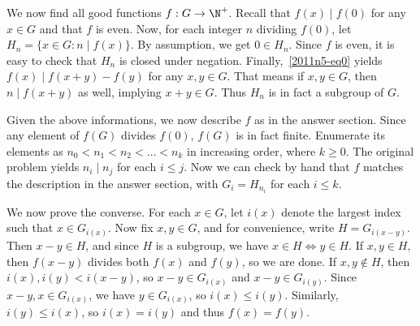 We now find all good functions $f : G \to \N^+$.
Recall that $f(x) \mid f(0)$ for any $x \in G$ and that $f$ is even.
Now, for each integer $n$ dividing $f(0)$, let $H_n = \{x \in G : n \mid f(x)\}$.
By assumption, we get $0 \in H_n$.
Since $f$ is even, it is easy to check that $H_n$ is closed under negation.
Finally,~\eqref{2011n5-eq0} yields $f(x) \mid f(x + y) - f(y)$ for any $x, y \in G$.
That means if $x, y \in G$, then $n \mid f(x + y)$ as well, implying $x + y \in G$.
Thus $H_n$ is in fact a subgroup of $G$.

Given the above informations, we now describe $f$ as in the answer section.
Since any element of $f(G)$ divides $f(0)$, $f(G)$ is in fact finite.
Enumerate its elements as $n_0 < n_1 < n_2 < \ldots < n_k$ in increasing order, where $k \geq 0$.
The original problem yields $n_i \mid n_j$ for each $i \leq j$.
Now we can check by hand that $f$ matches the description in the answer section, with $G_i = H_{n_i}$ for each $i \leq k$.

We now prove the converse.
For each $x \in G$, let $i(x)$ denote the largest index such that $x \in G_{i(x)}$.
Now fix $x, y \in G$, and for convenience, write $H = G_{i(x - y)}$.
Then $x - y \in H$, and since $H$ is a subgroup, we have $x \in H \iff y \in H$.
If $x, y \in H$, then $f(x - y)$ divides both $f(x)$ and $f(y)$, so we are done.
If $x, y \notin H$, then $i(x), i(y) < i(x - y)$, so $x - y \in G_{i(x)}$ and $x - y \in G_{i(y)}$.
Since $x - y, x \in G_{i(x)}$, we have $y \in G_{i(x)}$, so $i(x) \leq i(y)$.
Similarly, $i(y) \leq i(x)$, so $i(x) = i(y)$ and thus $f(x) = f(y)$.
